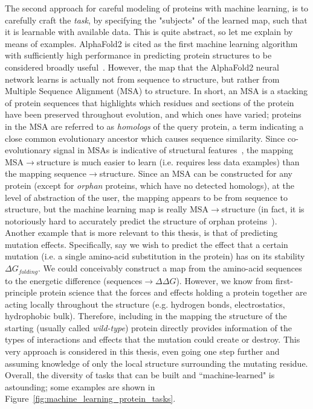 The second approach for careful modeling of proteins with machine learning, is to carefully craft the \textit{task},
by specifying the "subjects" of the learned map, such that it is learnable with available data.
This is quite abstract, so let me explain by means of examples.
AlphaFold2 is cited as the first machine learning algorithm with sufficiently high performance in predicting protein structures
to be considered broadly useful~\citep{jumper_highly_2021}. However, the map that the AlphaFold2 neural network learns is actually not from sequence to structure, but rather
from Multiple Sequence Alignment (MSA) to structure. In short, an MSA is a stacking of protein sequences that highlights which residues and sections 
of the protein have been preserved throughout evolution, and which ones have varied; proteins in the MSA are referred to as \textit{homologs} of the query protein,
a term indicating a close common evolutionary ancestor which causes sequence similarity.
Since co-evolutionary signal in MSAs is indicative of structural features~\citep{gobel_correlated_1994}, the mapping MSA$\to$structure is much easier to learn
(i.e. requires less data examples) than the mapping sequence$\to$structure.
Since an MSA can be constructed for any protein (except for \textit{orphan} proteins, which have no detected homologs), at the level of abstraction of the user, the mapping appears
to be from sequence to structure, but the machine learning map is really MSA$\to$structure (in fact, it is notoriously hard to accurately predict the structure
of orphan proteins~\citep{chowdhury_single-sequence_2022}).
Another example that is more relevant to this thesis, is that of predicting mutation effects.
Specifically, say we wish to predict the effect that a certain mutation (i.e. a single amino-acid substitution in the protein) has on its stability $\Delta G_{folding}$.
We could conceivably construct a map from the amino-acid sequences to the energetic difference (sequences$\to$$\Delta\Delta G$).
However, we know from first-principle protein science that the forces and effects holding a protein together are acting locally throughout the structure
(e.g. hydrogen bonds, electrostatics, hydrophobic bulk). Therefore, including in the mapping the structure of the starting (usually called \textit{wild-type})
protein directly provides information of the types of interactions and effects that the mutation could create or destroy.
This very approach is considered in this thesis, even going one step further and assuming knowledge of only the local structure surrounding the
mutating residue.
Overall, the diversity of tasks that can be built and ``machine-learned" is astounding; some examples are shown in Figure~\ref{fig:machine_learning_protein_tasks}.

